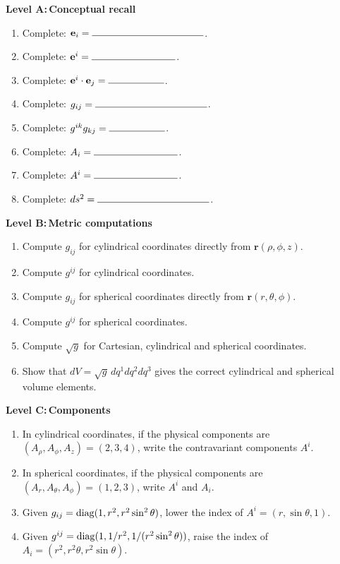 \documentclass{otscience}
\begin{document}
\begin{practicebox}
    \textbf{Level A:\,Conceptual recall}

        \begin{enumerate}
            \item Complete: \(\mathbf{e}_i=\blank[4cm]\).
            \item Complete: \(\mathbf{e}^i=\blank[3cm]\).
            \item Complete: \(\mathbf{e}^i\cdot\mathbf{e}_j=\blank[2cm]\).
            \item Complete: \(g_{ij}=\blank[4cm]\).
            \item Complete: \(g^{ik}g_{kj}=\blank[2cm]\).
            \item Complete: \(A_i=\blank[3cm]\).
            \item Complete: \(A^i=\blank[3cm]\).
            \item Complete: \(ds^2=\blank[4cm]\).
        \end{enumerate}


    \textbf{Level B:\,Metric computations}
    \begin{enumerate}
        \item Compute \(g_{ij}\) for cylindrical coordinates directly from \(\mathbf{r}(\rho,\phi,z)\).
        \item Compute \(g^{ij}\) for cylindrical coordinates.
        \item Compute \(g_{ij}\) for spherical coordinates directly from \(\mathbf{r}(r,\theta,\phi)\).
        \item Compute \(g^{ij}\) for spherical coordinates.
        \item Compute \(\sqrt{g}\) for Cartesian, cylindrical and spherical coordinates.
        \item Show that \(dV=\sqrt{g}\,dq^1dq^2dq^3\) gives the correct cylindrical and spherical volume elements.
    \end{enumerate}

    \textbf{Level C:\,Components}
    \begin{enumerate}
        \item In cylindrical coordinates, if the physical components are \((A_\rho,A_\phi,A_z)=(2,3,4)\), write the contravariant components \(A^i\).
        \item In spherical coordinates, if the physical components are \((A_r,A_\theta,A_\phi)=(1,2,3)\), write \(A^i\) and \(A_i\).
        \item Given \(g_{ij}=\operatorname{diag}(1,r^2,r^2\sin^2\theta)\), lower the index of \(A^i=(r,\sin\theta,1)\).
        \item Given \(g^{ij}=\operatorname{diag}(1,1/r^2,1/(r^2\sin^2\theta))\), raise the index of \(A_i=(r^2,r^2\theta,r^2\sin\theta)\).
    \end{enumerate}


\end{practicebox}
\end{document}
